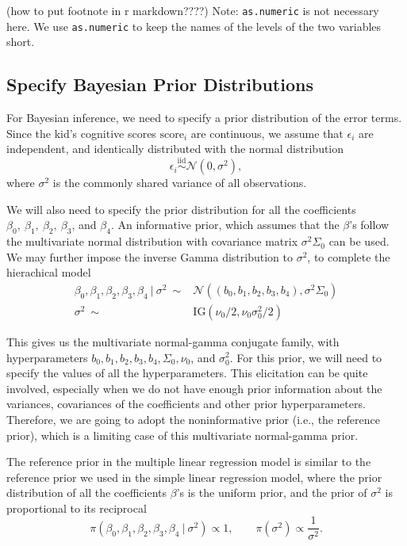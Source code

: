 \documentclass[]{book}
\theoremstyle{definition}
\theoremstyle{definition}
\theoremstyle{definition}
\theoremstyle{remark}
\begin{document}
(how to put footnote in r markdown????) Note: \texttt{as.numeric} is not
necessary here. We use \texttt{as.numeric} to keep the names of the
levels of the two variables short.

\subsection{Specify Bayesian Prior
Distributions}\label{specify-bayesian-prior-distributions}

For Bayesian inference, we need to specify a prior distribution of the
error terms. Since the kid's cognitive scores \(\text{score}_i\) are
continuous, we assume that \(\epsilon_i\) are independent, and
identically distributed with the normal distribution
\[ \epsilon_i \overset{\text{iid}}{\sim} \mathcal{N}(0, \sigma^2), \]
where \(\sigma^2\) is the commonly shared variance of all observations.

We will also need to specify the prior distribution for all the
coefficients \(\beta_0,\ \beta_1,\ \beta_2,\ \beta_3\), and \(\beta_4\).
An informative prior, which assumes that the \(\beta\)'s follow the
multivariate normal distribution with covariance matrix
\(\sigma^2\Sigma_0\) can be used. We may further impose the inverse
Gamma distribution to \(\sigma^2\), to complete the hierachical model
\[ 
\begin{aligned}
\beta_0, \beta_1, \beta_2, \beta_3, \beta_4 ~|~\sigma^2 \ \sim & \mathcal{N}((b_0, b_1, b_2, b_3, b_4), \sigma^2\Sigma_0)\\
\sigma^2 \ \sim & \text{IG}(\nu_0/2, \nu_0\sigma_0^2/2) 
\end{aligned}
\]

This gives us the multivariate normal-gamma conjugate family, with
hyperparameters \(b_0, b_1, b_2, b_3, b_4, \Sigma_0, \nu_0\), and
\(\sigma_0^2\). For this prior, we will need to specify the values of
all the hyperparameters. This elicitation can be quite involved,
especially when we do not have enough prior information about the
variances, covariances of the coefficients and other prior
hyperparameters. Therefore, we are going to adopt the noninformative
prior (i.e., the reference prior), which is a limiting case of this
multivariate normal-gamma prior.

The reference prior in the multiple linear regression model is similar
to the reference prior we used in the simple linear regression model,
where the prior distribution of all the coefficients \(\beta\)'s is the
uniform prior, and the prior of \(\sigma^2\) is proportional to its
reciprocal
\[ \pi(\beta_0,\beta_1,\beta_2,\beta_3,\beta_4~|~\sigma^2) \propto 1,\qquad \pi(\sigma^2) \propto \frac{1}{\sigma^2}. \]
\end{document}
